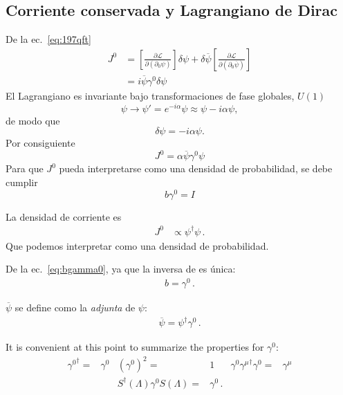 \subsection{Corriente conservada y Lagrangiano de Dirac}
\label{sec:corriente-conservada}
De la ec.~\eqref{eq:197qft}
\begin{align}
  J^0&=\left[\frac{\partial\mathcal{L}}{\partial\left(\partial_0\psi\right)}\right]\delta\psi+\delta\overline{\psi}\left[\frac{\partial\mathcal{L}}{\partial\left(\partial_0\overline{\psi}\right)}\right]\nonumber\\
  &=i\overline{\psi} \gamma^0 \delta\psi
\end{align}
El Lagrangiano es invariante bajo transformaciones de fase globales, $U(1)$
\begin{equation}
  \psi\to\psi'=e^{-i\alpha}\psi\approx\psi-i\alpha\psi,
\end{equation}
de modo que
\begin{equation}
  \delta\psi=-i\alpha\psi.
\end{equation}
Por consiguiente
\begin{equation}
  J^0=\alpha\overline{\psi} \gamma^0 \psi 
\end{equation}
Para que $J^0$ pueda interpretarse como una densidad de probabilidad, se debe cumplir
\begin{equation}
  \label{eq:bgamma0}
  b \gamma^0=I
\end{equation}


La  densidad de corriente es
\begin{align}
  J^0&\propto \psi^\dagger\psi\,.
\end{align}
Que podemos interpretar como una densidad de probabilidad.

De la ec.~\eqref{eq:bgamma0}, ya que la inversa de es única:
\begin{align}
  b=\gamma^0\,.
\end{align}
 
$\overline{\psi}$ se define como la \emph{adjunta} de $\psi$:
 \begin{align}
   \overline{\psi}=\psi^\dagger\gamma^0\,.
 \end{align}

It is convenient at this point to summarize the properties for $\gamma^0$:
\begin{align}
  \label{eq:cft77}
  {\gamma^0}^\dagger=&\gamma^0 & \left(\gamma^0\right)^2=&1 & \gamma^0{\gamma^\mu}^\dagger\gamma^0=&\gamma^\mu\nonumber\\
 &&   S^\dagger(\Lambda)\gamma^0S(\Lambda)=&\gamma^0\,. &&
\end{align}



